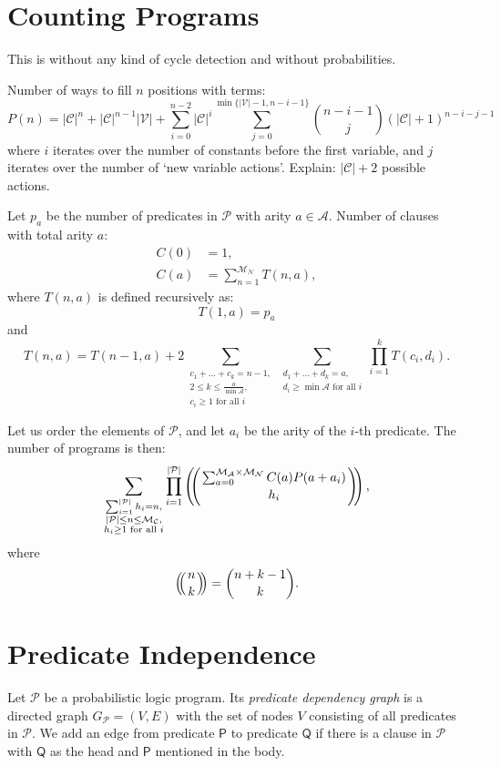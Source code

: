 \documentclass[runningheads]{llncs}
\newcommand{\predicates}{\mathcal{P}}
\newcommand{\variables}{\mathcal{V}}
\newcommand{\constants}{\mathcal{C}}
\newcommand{\arities}{\mathcal{A}}
\newcommand{\maxArity}{\mathcal{M}_{\mathcal{A}}}
\newcommand{\maxNumNodes}{\mathcal{M}_{\mathcal{N}}}
\newcommand{\maxNumClauses}{\mathcal{M}_{\mathcal{C}}}
\def\multiset#1#2{\ensuremath{\left(\kern-.3em\left(\genfrac{}{}{0pt}{}{#1}{#2}\right)\kern-.3em\right)}}
\begin{document}
\section{Counting Programs}

This is without any kind of cycle detection and without probabilities.

Number of ways to fill $n$ positions with terms: %
\[
  P(n) = |\constants{}|^n + |\constants{}|^{n-1}|\variables{}| +
  \sum_{i=0}^{n-2} |\constants{}|^i \sum_{j=0}^{\min\{|\variables{}| - 1, n - i
    - 1\}} \binom{n-i-1}{j} (|\constants{}| + 1)^{n-i-j-1}
\]
where $i$ iterates over the number of constants before the first variable, and
$j$ iterates over the number of `new variable actions'. Explain:
$|\constants{}|+2$ possible actions.

Let $p_a$ be the number of predicates in $\predicates{}$ with arity $a \in
\arities{}$. Number of clauses with total arity $a$:
\begin{align*}
  C(0) &= 1,\\
  C(a) &= \sum_{n=1}^{\maxNumNodes{}} T(n, a),
\end{align*}
where $T(n, a)$ is defined recursively as:
\[
  T(1, a) = p_a
\]
and
\[
  T(n, a) = T(n-1, a) + 2\sum_{\substack{c_1 + \dots + c_k = n - 1,\\
      2 \le k \le \frac{a}{\min \arities{}},\\
      c_i \ge 1 \text{ for all } i}} \sum_{\substack{d_1 + \dots + d_k = a,\\
    d_i \ge \min \arities{} \text{ for all } i}} \prod_{i=1}^k T(c_i, d_i).
\]

Let us order the elements of $\predicates{}$, and let $a_i$ be the arity of the
$i$-th predicate. The number of programs is then:
\[
  \sum_{\substack{ \sum_{i=1}^{|\predicates{}|} h_i = n,\\
      |\predicates{}| \le n \le \maxNumClauses,\\
      h_i \ge 1 \text{ for all } i}} \prod_{i=1}^{|\predicates{}|}
  \multiset{\sum_{a=0}^{\maxArity{} \times \maxNumNodes{}} C(a) P(a+a_i)}{h_i},
\]
where
\[
  \multiset{n}{k} = \binom{n+k-1}{k}.
\]

\section{Predicate Independence}

\begin{definition}
  Let $\mathscr{P}$ be a probabilistic logic program. Its \emph{predicate
    dependency graph} is a directed graph $G_{\mathscr{P}} = (V, E)$ with the
  set of nodes $V$ consisting of all predicates in $\mathscr{P}$. We add an edge
  from predicate $\mathsf{P}$ to predicate $\mathsf{Q}$ if there is a clause in
  $\mathscr{P}$ with $\mathsf{Q}$ as the head and $\mathsf{P}$ mentioned in the
  body.
\end{definition}
\end{document}
